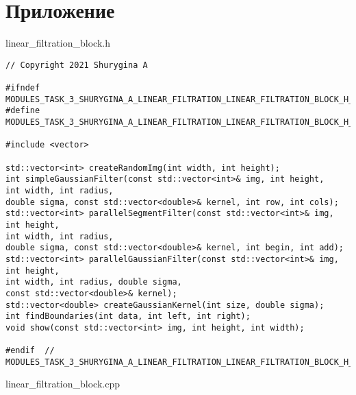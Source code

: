 \documentclass{report}
\begin{document}
\section*{Приложение}

linear\_filtration\_block.h 
\begin{lstlisting}
// Copyright 2021 Shurygina A

#ifndef MODULES_TASK_3_SHURYGINA_A_LINEAR_FILTRATION_LINEAR_FILTRATION_BLOCK_H_
#define MODULES_TASK_3_SHURYGINA_A_LINEAR_FILTRATION_LINEAR_FILTRATION_BLOCK_H_

#include <vector>

std::vector<int> createRandomImg(int width, int height);
int simpleGaussianFilter(const std::vector<int>& img, int height,
int width, int radius,
double sigma, const std::vector<double>& kernel, int row, int cols);
std::vector<int> parallelSegmentFilter(const std::vector<int>& img, int height,
int width, int radius,
double sigma, const std::vector<double>& kernel, int begin, int add);
std::vector<int> parallelGaussianFilter(const std::vector<int>& img, int height,
int width, int radius, double sigma,
const std::vector<double>& kernel);
std::vector<double> createGaussianKernel(int size, double sigma);
int findBoundaries(int data, int left, int right);
void show(const std::vector<int> img, int height, int width);

#endif  // MODULES_TASK_3_SHURYGINA_A_LINEAR_FILTRATION_LINEAR_FILTRATION_BLOCK_H_

\end{lstlisting}
linear\_filtration\_block.cpp 
\end{document}
